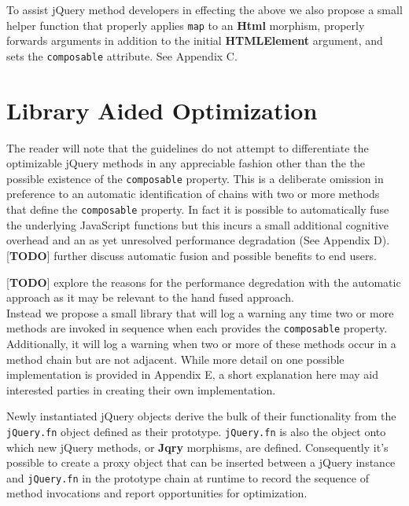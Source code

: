 \documentclass[preprint]{sigplanconf}
\begin{document}
To assist jQuery method developers in effecting the above we also propose a small helper function that properly applies \verb|map| to an \textbf{Html} morphism, properly forwards arguments in addition to the initial \textbf{HTMLElement} argument, and sets the \verb|composable| attribute. See Appendix C.

\section{Library Aided Optimization} \label{sec:library-aided-optimization}

The reader will note that the guidelines do not attempt to differentiate the optimizable jQuery methods in any appreciable fashion other than the the possible existence of the \verb|composable| property. This is a deliberate omission in preference to an automatic identification of chains with two or more methods that define the \verb|composable| property. In fact it is possible to automatically fuse the underlying JavaScript functions but this incurs a small additional cognitive overhead and an as yet unresolved performance degradation (See Appendix D).
\\

[\textbf{TODO}] further discuss automatic fusion and possible benefits to end users.

[\textbf{TODO}] explore the reasons for the performance degredation with the automatic approach as it may be relevant to the hand fused approach.
\\

Instead we propose a small library that will log a warning any time two or more methods are invoked in sequence when each provides the \verb|composable| property. Additionally, it will log a warning when two or more of these methods occur in a method chain but are not adjacent. While more detail on one possible implementation is provided in Appendix E, a short explanation here may aid interested parties in creating their own implementation.

Newly instantiated jQuery objects derive the bulk of their functionality from the \verb|jQuery.fn| object defined as their prototype. \verb|jQuery.fn| is also the object onto which new jQuery methods, or \textbf{Jqry} morphisms, are defined. Consequently it's possible to create a proxy object that can be inserted between a jQuery instance and \verb|jQuery.fn| in the prototype chain at runtime to record the sequence of method invocations and report opportunities for optimization.
\end{document}
